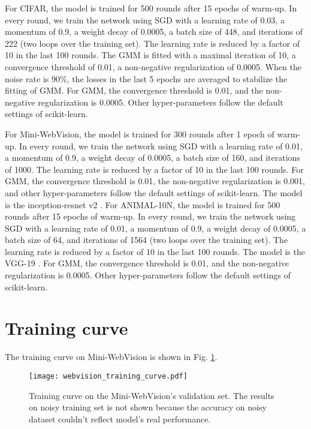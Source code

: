 \documentclass[letterpaper]{article} \usepackage{aaai23}  \usepackage{times}  \usepackage{helvet}  \usepackage{courier}  \usepackage[hyphens]{url}  \usepackage{graphicx} \urlstyle{rm} \def\UrlFont{\rm}  \usepackage{natbib}  \usepackage{caption} \frenchspacing  \setlength{\pdfpagewidth}{8.5in} \setlength{\pdfpageheight}{11in} \usepackage{algorithm}
\begin{document}
For CIFAR, the model is trained for 500 rounds after 15 epochs of warm-up.
In every round, we train the network using SGD with a learning rate of 0.03, a momentum of 0.9, a weight decay of 0.0005, a batch size of 448, and iterations of 222 (two loops over the training set).
The learning rate is reduced by a factor of 10 in the last 100 rounds.
The GMM is fitted with a maximal iteration of 10, a convergence threshold of 0.01, a non-negative regularization of 0.0005.
When the noise rate is 90\%, the losses in the last 5 epochs are averaged to stabilize the fitting of GMM.
For GMM, the convergence threshold is 0.01, and the non-negative regularization is 0.0005. Other hyper-parameters follow the default settings of scikit-learn.

For Mini-WebVision, the model is trained for 300 rounds after 1 epoch of warm-up.
In every round, we train the network using SGD with a learning rate of 0.01, a momentum of 0.9, a weight decay of 0.0005, a batch size of 160, and iterations of 1000.
The learning rate is reduced by a factor of 10 in the last 100 rounds.
For GMM, the convergence threshold is 0.01, the non-negative regularization is 0.001, and other hyper-parameters follow the default settings of scikit-learn.
The model is the inception-resnet v2 \cite{szegedy2017inception}.
For ANIMAL-10N, the model is trained for 500 rounds after 15 epochs of warm-up.
In every round, we train the network using SGD with a learning rate of 0.01, a momentum of 0.9, a weight decay of 0.0005, a batch size of 64, and iterations of 1564 (two loops over the training set).
The learning rate is reduced by a factor of 10 in the last 100 rounds.
The model is the VGG-19 \cite{DBLP:journals/corr/SimonyanZ14a}.
For GMM, the convergence threshold is 0.01, and the non-negative regularization is 0.0005. Other hyper-parameters follow the default settings of scikit-learn.

\section{Training curve}
The training curve on Mini-WebVision is shown in Fig. \ref{fig_curve}.

\begin{figure}[h!]
    \centering
    \texttt{[image: webvision\_training\_curve.pdf]} 
    \caption{Training curve on the Mini-WebVision's validation set. The results on noisy training set is not shown because the accuracy on noisy dataset couldn't reflect model's real performance.} 
    \label{fig_curve}
\end{figure}
\end{document}
